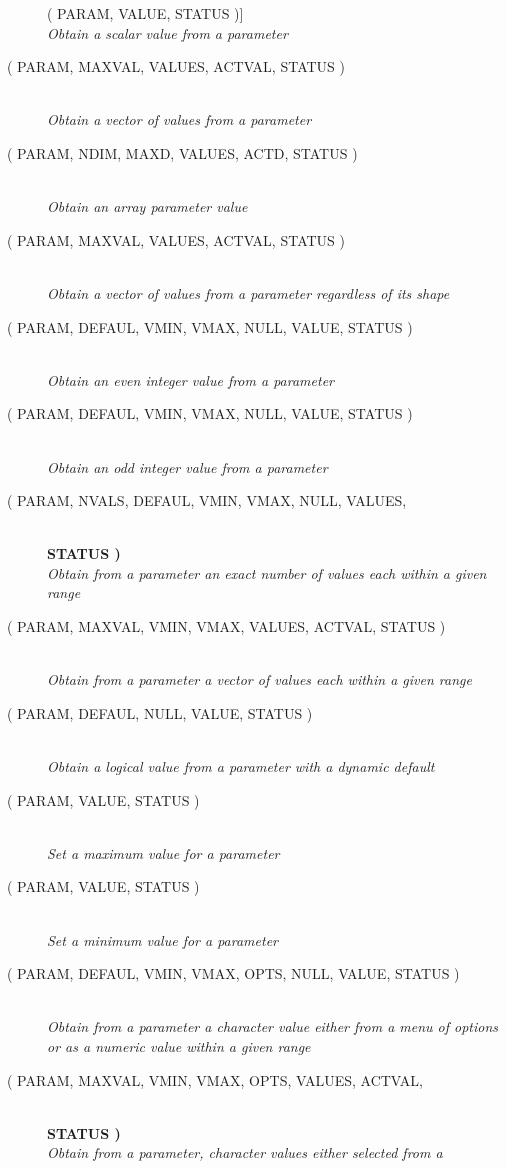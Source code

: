 \documentclass[twoside,11pt,nolof]{starlink}
\providecommand{\listline}{\hspace{1pt}\\}
\providecommand{\listova}[1]{}
\providecommand{\listovb}[1]{\textbf{#1}\\}
\begin{document}
\begin{description}
( PARAM, VALUE, STATUS )] \listline
\textit{Obtain a scalar value from a parameter}
\item [\htmlref{PAR\_GET1x}{PAR_GET1x}
( PARAM, MAXVAL, VALUES, ACTVAL, STATUS )] \listline
\textit{Obtain a vector of values from a parameter}
\item [\htmlref{PAR\_GETNx}{PAR_GETNx}
( PARAM, NDIM, MAXD, VALUES, ACTD, STATUS )] \listline
\textit{Obtain an array parameter value}
\item [\htmlref{PAR\_GETVx}{PAR_GETVx}
( PARAM, MAXVAL, VALUES, ACTVAL, STATUS )] \listline
\textit{Obtain a vector of values from a parameter regardless of its shape}
\item [\htmlref{PAR\_GEVEN}{PAR_GEVEN}
( PARAM, DEFAUL, VMIN, VMAX, NULL, VALUE, STATUS )] \listline
\textit{Obtain an even integer value from a parameter}
\item [\htmlref{PAR\_GODD}{PAR_GODD}
( PARAM, DEFAUL, VMIN, VMAX, NULL, VALUE, STATUS )] \listline
\textit{Obtain an odd integer value from a parameter}
\item [\htmlref{PAR\_GRM1x}{PAR_GRM1x}
( PARAM, NVALS, DEFAUL, VMIN, VMAX, NULL, VALUES, \listova{STATUS )}] \listline
\listovb{STATUS )}
\textit{Obtain from a parameter an exact number of values each within a
            given range}
\item [\htmlref{PAR\_GRMVx}{PAR_GRMVx}
( PARAM, MAXVAL, VMIN, VMAX, VALUES, ACTVAL, STATUS )] \listline
\textit{Obtain from a parameter a vector of values each within a given
            range}
\item [\htmlref{PAR\_GTD0L}{PAR_GTD0L}
( PARAM, DEFAUL, NULL, VALUE, STATUS )] \listline
\textit{Obtain a logical value from a parameter with a dynamic default}
\item [\htmlref{PAR\_MAXx}{PAR_MAXx}
( PARAM, VALUE, STATUS )] \listline
\textit{Set a maximum value for a parameter}
\item [\htmlref{PAR\_MINx}{PAR_MINx}
( PARAM, VALUE, STATUS )] \listline
\textit{Set a minimum value for a parameter}
\item [\htmlref{PAR\_MIX0x}{PAR_MIX0x}
( PARAM, DEFAUL, VMIN, VMAX, OPTS, NULL, VALUE, STATUS )] \listline
\textit{Obtain from a parameter a character value either from a menu of
            options or as a numeric value within a given range}
\item [\htmlref{PAR\_MIXVx}{PAR_MIXVx}
( PARAM, MAXVAL, VMIN, VMAX, OPTS, VALUES, ACTVAL, \listova{STATUS )}] \listline
\listovb{STATUS )}
\textit{Obtain from a parameter, character values either selected from a
}
\end{description}
\end{document}
